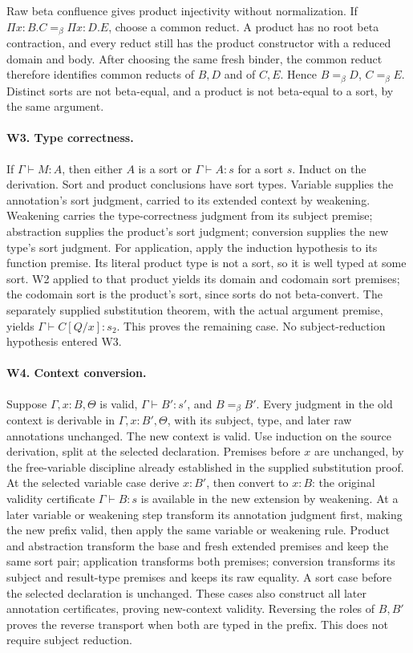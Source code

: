 Raw beta confluence gives product injectivity without normalization.
If \(\Pi x:B.C=_\beta\Pi x:D.E\), choose a common reduct.
A product has no root beta contraction, and every reduct still has
the product constructor with a reduced domain and body. After choosing
the same fresh binder, the common reduct therefore identifies common
reducts of \(B,D\) and of \(C,E\). Hence
\(B=_\beta D\), \(C=_\beta E\). Distinct sorts are not beta-equal,
and a product is not beta-equal to a sort, by the same argument.

\paragraph{W3. Type correctness.}
If \(\Gamma\vdash M:A\), then either \(A\) is a sort or
\(\Gamma\vdash A:s\) for a sort \(s\).
Induct on the derivation. Sort and product conclusions have sort types.
Variable supplies the annotation's sort judgment, carried to its
extended context by weakening. Weakening carries the type-correctness
judgment from its subject premise; abstraction supplies the product's
sort judgment; conversion supplies the new type's sort judgment.
For application, apply the induction hypothesis to its function premise.
Its literal product type is not a sort, so it is well typed at some sort.
W2 applied to that product yields its domain and codomain sort premises;
the codomain sort is the product's sort, since sorts do not beta-convert.
The separately supplied substitution theorem, with the actual argument
premise, yields \(\Gamma\vdash C[Q/x]:s_2\). This proves the remaining
case. No subject-reduction hypothesis entered W3.

\paragraph{W4. Context conversion.}
Suppose \(\Gamma,x:B,\Theta\) is valid,
\(\Gamma\vdash B':s'\), and \(B=_\beta B'\).
Every judgment in the old context is derivable in
\(\Gamma,x:B',\Theta\), with its subject, type, and later raw
annotations unchanged. The new context is valid.
Use induction on the source derivation, split at the selected declaration.
Premises before \(x\) are unchanged, by the free-variable discipline
already established in the supplied substitution proof. At the selected
variable case derive \(x:B'\), then convert to \(x:B\): the original
validity certificate \(\Gamma\vdash B:s\) is available in the new
extension by weakening. At a later variable or weakening step transform
its annotation judgment first, making the new prefix valid, then apply
the same variable or weakening rule. Product and abstraction transform
the base and fresh extended premises and keep the same sort pair;
application transforms both premises; conversion transforms its subject
and result-type premises and keeps its raw equality. A sort case before
the selected declaration is unchanged. These cases also construct all
later annotation certificates, proving new-context validity. Reversing
the roles of \(B,B'\) proves the reverse transport when both are typed
in the prefix. This does not require subject reduction.

